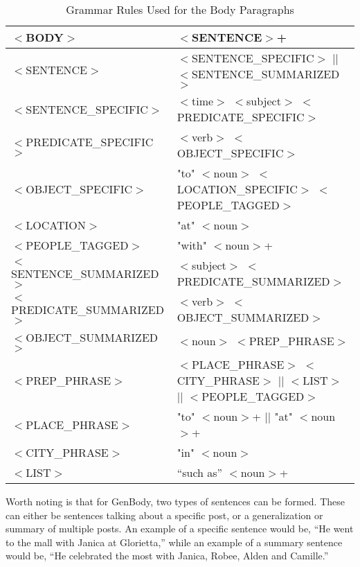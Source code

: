\clearpage
\begin{table}[ph!]   
	\centering
	\caption{Grammar Rules Used for the Body Paragraphs} \vspace{0.25em}
	\begin{tabular}{|p{2.4in}|p{3in}|} \hline
		{$<$BODY$>$}  & {$<$SENTENCE$>$+} \\ \hline
		$<$SENTENCE$>$ & $<$SENTENCE\_SPECIFIC$>$ $|$$|$ $<$SENTENCE\_SUMMARIZED$>$ \\ \hline
		$<$SENTENCE\_SPECIFIC$>$ & $<$time$>$ $<$subject$>$ $<$PREDICATE\_SPECIFIC$>$\\ \hline
		$<$PREDICATE\_SPECIFIC$>$ & $<$verb$>$ $<$OBJECT\_SPECIFIC$>$ \\ \hline
		$<$OBJECT\_SPECIFIC$>$ & "to" $<$noun$>$ $<$LOCATION\_SPECIFIC$>$ $<$PEOPLE\_TAGGED$>$ \\ \hline
		$<$LOCATION$>$ & "at" $<$noun$>$ \\ \hline
		$<$PEOPLE\_TAGGED$>$ & "with" $<$noun$>$+ \\ \hline
		$<$SENTENCE\_SUMMARIZED$>$ & $<$subject$>$ $<$PREDICATE\_SUMMARIZED$>$\\ \hline
		$<$PREDICATE\_SUMMARIZED$>$ & $<$verb$>$ $<$OBJECT\_SUMMARIZED$>$ \\ \hline
		$<$OBJECT\_SUMMARIZED$>$ & $<$noun$>$ $<$PREP\_PHRASE$>$ \\ \hline
		$<$PREP\_PHRASE$>$ & $<$PLACE\_PHRASE$>$ $<$CITY\_PHRASE$>$ $|$$|$ \newline $<$LIST$>$ $|$$|$ \newline $<$PEOPLE\_TAGGED$>$ \\ \hline
		$<$PLACE\_PHRASE$>$ & "to" $<$noun$>$+ $|$$|$ \newline "at" $<$noun$>$+ \\ \hline
		$<$CITY\_PHRASE$>$ & "in" $<$noun$>$ \\ \hline
		$<$LIST$>$ & ``such as” $<$noun$>$+ \\ \hline
	\end{tabular}
	\label{tab:GrammarRules-bodypar}
\end{table}

Worth noting is that for GenBody, two types of sentences can be formed. These can either be sentences talking about a specific post, or a generalization or summary of multiple posts. An example of a specific sentence would be, “He went to the mall with Janica at Glorietta,” while an example of a summary sentence would be, ``He celebrated the most with Janica, Robee, Alden and Camille.”

